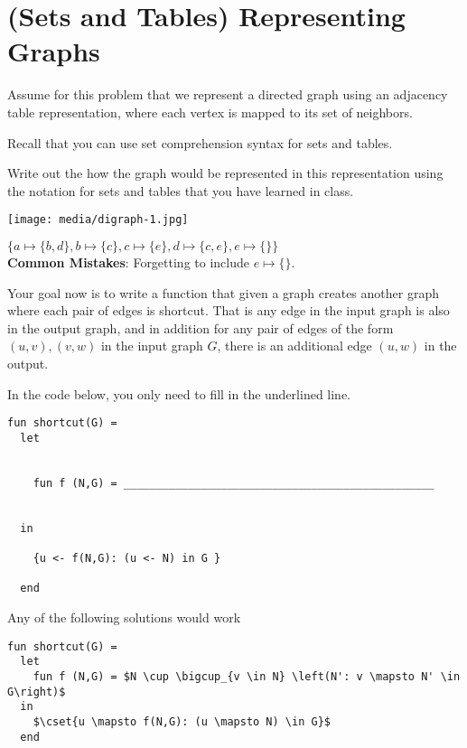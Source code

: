 \section{(Sets and Tables) Representing Graphs}


\begin{problem}

Assume for this problem that we represent a directed graph using an
adjacency table representation, where each vertex is mapped to its set
of neighbors. 

Recall that you can use set comprehension syntax for sets and tables.

\ask[5]
Write out the how the graph would be represented in this
representation using the notation for sets and tables that you have
learned in class.

\begin{center}
\texttt{[image: media/digraph-1.jpg]}
\end{center}

\sol
$\{a \mapsto \{b,d\}, b \mapsto \{c\}, c \mapsto \{e\}, d \mapsto \{c,e\}, e \mapsto \{\} \}$ \\

\notes
\textbf{Common Mistakes}: Forgetting to include $e \mapsto \{\}$. 


\ask[12]
Your goal now is to write a function that given a graph creates
another graph where each pair of edges is shortcut.  That is any edge
in the input graph is also in the output graph, and in addition for
any pair of edges of the form $(u,v),(v,w)$ in the input graph $G$,
there is an additional edge $(u,w)$ in the output.

In the code below, you only need to fill in the underlined line. 

\begin{lstlisting}[numbers=none]
fun shortcut(G) = 
  let 


    fun f (N,G) = ________________________________________________


  in   

    {u <- f(N,G): (u <- N) in G }

  end

\end{lstlisting}

\sol
Any of the following solutions would work 
\begin{lstlisting}[numbers=none]
fun shortcut(G) = 
  let 
    fun f (N,G) = $N \cup \bigcup_{v \in N} \left(N': v \mapsto N' \in G\right)$
  in   
    $\cset{u \mapsto f(N,G): (u \mapsto N) \in G}$
  end
\end{lstlisting}


\end{problem}
